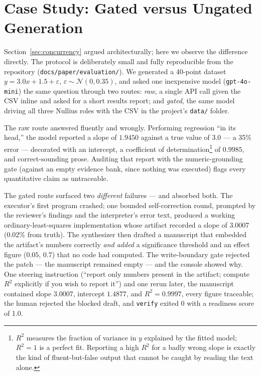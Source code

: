 \documentclass[11pt]{article}
\begin{document}
\section{Case Study: Gated versus Ungated Generation}
\label{sec:casestudy}

Section~\ref{sec:concurrency} argued architecturally; here we observe the difference directly. The protocol is deliberately small and fully reproducible from the repository (\texttt{docs/paper/evaluation/}). We generated a 40-point dataset $y = 3.0x + 1.5 + \varepsilon$, $\varepsilon \sim \mathcal{N}(0, 0.35)$, and asked one inexpensive model (\texttt{gpt-4o-mini}) the same question through two routes: \emph{raw}, a single API call given the CSV inline and asked for a short results report; and \emph{gated}, the same model driving all three Nullius roles with the CSV in the project's \texttt{data/} folder.

The raw route answered fluently and wrongly. Performing regression ``in its head,'' the model reported a slope of $1.9450$ against a true value of $3.0$ --- a 35\% error --- decorated with an intercept, a coefficient of determination\footnote{$R^2$ measures the fraction of variance in $y$ explained by the fitted model; $R^2=1$ is a perfect fit. Reporting a high $R^2$ for a badly wrong slope is exactly the kind of fluent-but-false output that cannot be caught by reading the text alone.} of $0.9985$, and correct-sounding prose. Auditing that report with the numeric-grounding gate (against an empty evidence bank, since nothing was executed) flags every quantitative claim as untraceable.

The gated route surfaced two \emph{different} failures --- and absorbed both. The executor's first program crashed; one bounded self-correction round, prompted by the reviewer's findings and the interpreter's error text, produced a working ordinary-least-squares implementation whose artifact recorded a slope of $3.0007$ (0.02\% from truth). The synthesizer then drafted a manuscript that embedded the artifact's numbers correctly \emph{and added} a significance threshold and an effect figure ($0.05$, $0.7$) that no code had computed. The write-boundary gate rejected the patch --- the manuscript remained empty --- and the console showed why. One steering instruction (``report only numbers present in the artifact; compute $R^2$ explicitly if you wish to report it'') and one rerun later, the manuscript contained slope $3.0007$, intercept $1.4877$, and $R^2 = 0.9997$, every figure traceable; the human rejected the blocked draft, and \texttt{verify} exited 0 with a readiness score of 1.0.
\end{document}
